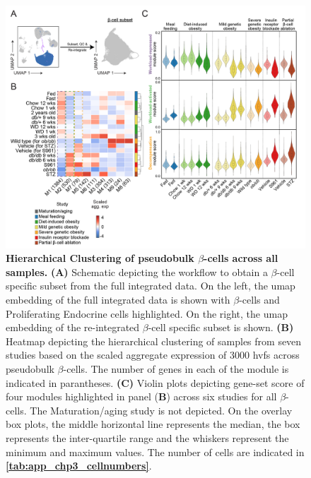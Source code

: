 \begin{figure}[H]
\centering
\includegraphics[width=\linewidth]{Chapter5/Fig/F3-3-01.png}
\caption[Hierarchical clustering of pseudobulk $\beta$-cells across all samples]{\textbf{Hierarchical Clustering of pseudobulk $\beta$-cells across all samples.} \textbf{(A)} Schematic depicting the workflow to obtain a  $\beta$-cell specific subset from the full integrated data. On the left, the \gls{umap} embedding of the full integrated data is shown with $\beta$-cells and Proliferating Endocrine cells highlighted. On the right, the \gls{umap} embedding of the re-integrated $\beta$-cell specific subset is shown. \textbf{(B)} Heatmap depicting the hierarchical clustering of samples from seven studies based on the scaled aggregate expression of 3000 \glspl{hvf} across pseudobulk $\beta$-cells. The number of genes in each of the module is indicated in parantheses. \textbf{(C)} Violin plots depicting gene-set score of four modules highlighted in panel (\textbf{B}) across six studies for all $\beta$-cells. The Maturation/aging study is not depicted. On the overlay box plots, the middle horizontal line represents the median, the box represents the inter-quartile range and the whiskers represent the minimum and maximum values. The number of cells are indicated in \textbf{\autoref{tab:app_chp3_cellnumbers}}.}
\label{fig:chp3_pseudobulk}
\vspace{-10pt}
\end{figure}



